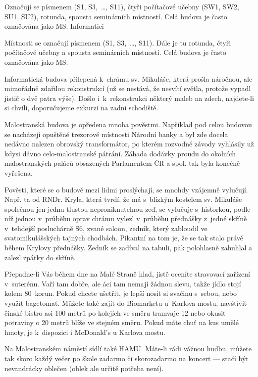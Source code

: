  {Označují se
písmenem  (S1, S3,~\dots, S11), čtyři počítačové učebny (SW1, SW2, SU1, SU2), rotunda, spousta seminárních
místností. Celá budova je často označována jako MS.} {Informatici}


Místnosti se označují písmenem
  (S1, S3,~\dots, S11). Dále je tu rotunda, čtyři počítačové učebny a spousta seminárních
 místností. Celá budova je často označována jako MS.

Informatická budova přilepená k~chrámu sv. Mikuláše, která prošla
náročnou, ale mimořádně zdařilou rekonstrukcí (už se nestává, že
nesvítí světla, protože vypadl jistič o dvě patra výše). Došlo
i~k~rekonstrukci některý maleb na zdech, najdete-li si chvíli,
doporučujeme exkurzi na zadní schodiště.

Malostranská budova je opředena mnoha pověstmi. Například pod
celou budovou se nacházejí opuštěné trezorové místnosti Národní
banky a byl zde docela nedávno nalezen obrovský transformátor, po
kterém rozvodné závody vyhlásily už kdysi dávno celo-malostranské
pátrání. Záhada dodávky proudu do okolních malostranských paláců
obsazených Parlamentem ČR a spol. tak byla konečně vyřešena.

Pověsti, které se o budově mezi lidmi proslýchají, se mnohdy
vzájemně vylučují. Např. ta od RNDr. Kryla, která tvrdí, že \mfz{}
má s~blízkým kostelem sv. Mikuláše společnou jen jednu tlustou
neproniknutelnou zeď, se vylučuje s~historkou, podle níž jednou
v~průběhu oprav chrámu vylezl v~průběhu přednášky z~jedné skříně
v~tehdejší posluchárně S6, zvané saloon, zedník, který zabloudil
ve svatomikulášských tajných chodbách. Pikantní na tom je, že se
tak stalo právě během Krylovy přednášky. Zedník se zadíval na
tabuli, pak polohlasně zahuhlal  a zalezl zpátky do
skříně.

Přepadne-li Vás během dne na Malé Straně hlad, jistě oceníte
stravovací zařízení  v~suterénu. Vaří tam dobře,
ale \mfz{}áci tam nemají žádnou slevu, takže jídlo stojí kolem
80~korun. Pokud chcete ušetřit, je lepší nosit si svačinu
s~sebou, nebo využít bagetomat. Můžete také zajít do Biomarketu
u~Karlova mostu, navštívit čínské bistro asi 100 metrů po kolejích
ve směru tramvaje 12 nebo okusit potraviny o 20 metrů blíže ve
stejném směru. Pokud máte chuť na kus umělé hmoty, je k~dispozici i McDonald's u Karlova mostu.

Na Malostranském náměstí sídlí také HAMU. Máte-li rádi vážnou hudbu, můžete tak skoro každý večer po škole zadarmo či skorozadarmo na koncert --- stačí být nevandrácky oblečen (oblek ale určitě potřeba není).


